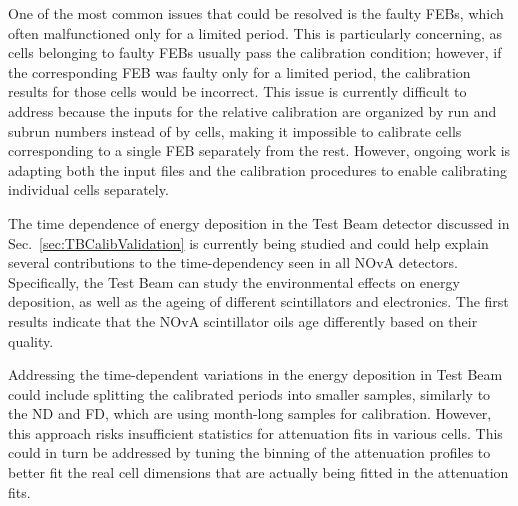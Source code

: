 One of the most common issues that could be resolved is the faulty \glspl{FEB}, which often malfunctioned only for a limited period. This is particularly concerning, as cells belonging to faulty \glspl{FEB} usually pass the calibration condition; however, if the corresponding \gls{FEB} was faulty only for a limited period, the calibration results for those cells would be incorrect. This issue is currently difficult to address because the inputs for the relative calibration are organized by run and subrun numbers instead of by cells, making it impossible to calibrate cells corresponding to a single \gls{FEB} separately from the rest. However, ongoing work is adapting both the input files and the calibration procedures to enable calibrating individual cells separately.

The time dependence of energy deposition in the Test Beam detector discussed in Sec.~\ref{sec:TBCalibValidation} is currently being studied and could help explain several contributions to the time-dependency seen in all \gls{NOvA} detectors. Specifically, the Test Beam can study the environmental effects on energy deposition, as well as the ageing of different scintillators and electronics. The first results indicate that the \gls{NOvA} scintillator oils age differently based on their quality. 

Addressing the time-dependent variations in the energy deposition in Test Beam could include splitting the calibrated periods into smaller samples, similarly to the \gls{ND} and \gls{FD}, which are using month-long samples for calibration. However, this approach risks insufficient statistics for attenuation fits in various cells. This could in turn be addressed by tuning the binning of the attenuation profiles to better fit the real cell dimensions that are actually being fitted in the attenuation fits.


